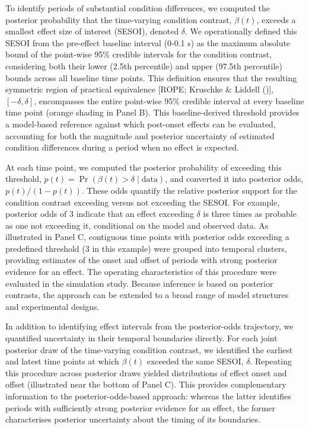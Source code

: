 \documentclass[
  doc,
  floatsintext,
  longtable,
  a4paper,
  nolmodern,
  notxfonts,
  notimes,
  colorlinks=true,linkcolor=blue,citecolor=blue,urlcolor=blue]{apa7}
\begin{document}
To identify periods of substantial condition differences, we computed
the posterior probability that the time-varying condition contrast,
\(\beta(t)\), exceeds a smallest effect size of interest (SESOI),
denoted \(\delta\). We operationally defined this SESOI from the
pre-effect baseline interval (0-0.1 s) as the maximum absolute bound of
the point-wise 95\% credible intervals for the condition contrast,
considering both their lower (2.5th percentile) and upper (97.5th
percentile) bounds across all baseline time points. This definition
ensures that the resulting symmetric region of practical equivalence
{[}ROPE; Kruschke \& Liddell (){]},
\([-\delta, \delta]\), encompasses the entire point-wise 95\% credible
interval at every baseline time point (orange shading in Panel B). This
baseline-derived threshold provides a model-based reference against
which post-onset effects can be evaluated, accounting for both the
magnitude and posterior uncertainty of estimated condition differences
during a period when no effect is expected.

At each time point, we computed the posterior probability of exceeding
this threshold, \(p(t) = \Pr(\beta(t) > \delta \mid \text{data})\), and
converted it into posterior odds, \(p(t)/(1-p(t))\). These odds quantify
the relative posterior support for the condition contrast exceeding
versus not exceeding the SESOI. For example, posterior odds of 3
indicate that an effect exceeding \(\delta\) is three times as probable
as one not exceeding it, conditional on the model and observed data. As
illustrated in Panel C, contiguous time points with posterior odds
exceeding a predefined threshold (3 in this example) were grouped into
temporal clusters, providing estimates of the onset and offset of
periods with strong posterior evidence for an effect. The operating
characteristics of this procedure were evaluated in the simulation
study. Because inference is based on posterior contrasts, the approach
can be extended to a broad range of model structures and experimental
designs.

In addition to identifying effect intervals from the posterior-odds
trajectory, we quantified uncertainty in their temporal boundaries
directly. For each joint posterior draw of the time-varying condition
contrast, we identified the earliest and latest time points at which
\(\beta(t)\) exceeded the same SESOI, \(\delta\). Repeating this
procedure across posterior draws yielded distributions of effect onset
and offset (illustrated near the bottom of Panel C). This provides
complementary information to the posterior-odds-based approach: whereas
the latter identifies periods with sufficiently strong posterior
evidence for an effect, the former characterises posterior uncertainty
about the timing of its boundaries.
\end{document}
